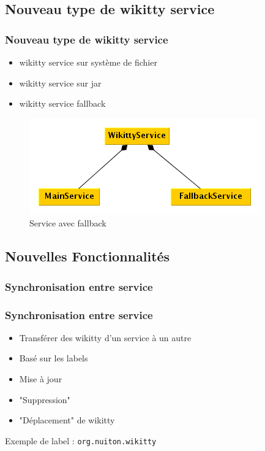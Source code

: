 \documentclass[12pt,a4paper,utf8x]{beamer}
\begin{document}
\subsection*{Nouveau type de wikitty service}
\begin{frame}\frametitle{Nouveau type de wikitty service}
\begin{itemize}
\item wikitty service sur système de fichier
\item wikitty service sur jar
\item wikitty service fallback\pause
\end{itemize}\pause

\begin{figure}
\includegraphics[scale=0.5]{../image/multicontext.png} 
\caption{Service avec fallback}
\end{figure}
\end{frame}


\subsection*{Nouvelles Fonctionnalités}






\subsubsection*{Synchronisation entre service}
\begin{frame}\frametitle{Synchronisation entre service}
\begin{itemize}
\item Transférer des wikitty d'un service à un autre
\item Basé sur les labels
\item Mise à jour
\item "Suppression"
\item "Déplacement" de wikitty
\end{itemize}
\pause
Exemple de label :
\verb!org.nuiton.wikitty!
\end{frame}
\end{document}
